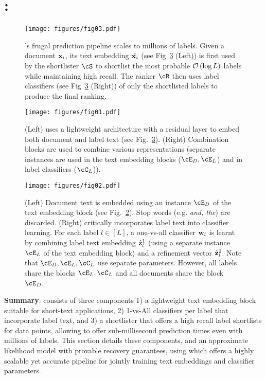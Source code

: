 \section{\alg: \algfull}
\label{sec:method}

\begin{figure}
    \centering
    \texttt{[image: figures/fig03.pdf]}
    \caption{\alg's frugal prediction pipeline scales to millions of labels. Given a document $\mathbf{x}_{i}$, its text embedding $\hat{\mathbf{x}_{i}}$ (see Fig~\ref{fig:embedding} (Left)) is first used by the shortlister $\cS$ to shortlist the most probable ${\mathcal O}\left({{\log L}}\right)$ labels while maintaining high recall. The ranker $\cR$ then uses label classifiers (see Fig~\ref{fig:embedding} (Right)) of only the shortlisted labels to produce the final ranking.}
    \label{fig:architecture}
\end{figure}

\begin{figure}
    \centering
    \texttt{[image: figures/fig01.pdf]}
    \caption{(Left) \alg uses a lightweight architecture with a residual layer to embed both document and label text (see Fig.~\ref{fig:embedding}). (Right) Combination blocks are used to combine various representations (separate instances are used in the text embedding blocks ($\cE_D, \cE_L$) and in label classifiers ($\cC_L$)).}
    \label{fig:blocks}
\end{figure}

\begin{figure}
    \centering
    \texttt{[image: figures/fig02.pdf]}
    \caption{(Left) Document text is embedded using an instance $\cE_D$ of the text embedding block (see Fig.~\ref{fig:blocks}). Stop words (e.g. \emph{and, the}) are discarded. (Right) \alg critically incorporates label text into classifier learning. For each label $l \in [L]$, a one-vs-all classifier $\protect{\mathbf{w}}_l$ is learnt by combining label text embedding $\hat{\protect{\mathbf{z}}}^1_l$ (using a separate instance $\cE_L$ of the text embedding block) and a refinement vector $\hat{\protect{\mathbf{z}}}^2_l$. Note that $\cE_D,\cE_L,\cC_L$ use separate parameters. However, all labels share the blocks $\cE_L, \cC_L$ and all documents share the block $\cE_D$.}
    \label{fig:embedding}
\end{figure}

\textbf{Summary}: \alg consists of three components 1) a lightweight text embedding block suitable for short-text applications, 2) 1-vs-All classifiers per label that incorporate label text, and 3) a shortlister that offers a high recall label shortlists for data points, allowing \alg to offer sub-millisecond prediction times even with millions of labels. This section details these components, and an approximate likelihood model with provable recovery guarantees, using which \alg offers a highly scalable yet accurate pipeline for jointly training text embeddings and classifier parameters.

